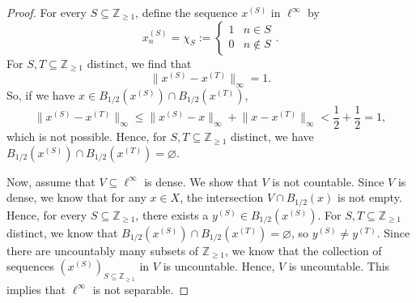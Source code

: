 \documentclass[a4paper, openany]{memoir}
\theoremstyle{definition}
\theoremstyle{plain}
\begin{document}
    \begin{proof}
        For every $S \subseteq \mathbb{Z}_{\geq 1}$, define the sequence $x^{(S)}$ in $\ell^\infty$ by
        \[x^{(S)}_n = \chi_S := \begin{cases}
            1 & n \in S \\
            0 & n \not\in S
        \end{cases}.\]
        For $S, T \subseteq \mathbb{Z}_{\geq 1}$ distinct, we find that
        \[\lVert x^{(S)} - x^{(T)} \rVert_\infty = 1.\]
        So, if we have $x \in B_{1/2}(x^{(S)}) \cap B_{1/2}(x^{(T)})$, 
        \[\lVert x^{(S)} - x^{(T)} \rVert_\infty \leq \lVert x^{(S)} - x \rVert_\infty + \lVert x - x^{(T)} \rVert_\infty < \frac{1}{2} + \frac{1}{2} = 1,\]
        which is not possible. Hence, for $S, T \subseteq \mathbb{Z}_{\geq 1}$ distinct, we have $B_{1/2}(x^{(S)}) \cap B_{1/2}(x^{(T)}) = \varnothing$.

        Now, assume that $V \subseteq \ell^\infty$ is dense. We show that $V$ is not countable. Since $V$ is dense, we know that for any $x \in X$, the intersection $V \cap B_{1/2}(x)$ is not empty. Hence, for every $S \subseteq \mathbb{Z}_{\geq 1}$, there exists a $y^{(S)} \in B_{1/2}(x^{(S)})$. For $S, T \subseteq \mathbb{Z}_{\geq 1}$ distinct, we know that $B_{1/2}(x^{(S)}) \cap B_{1/2}(x^{(T)}) = \varnothing$, so $y^{(S)} \neq y^{(T)}$. Since there are uncountably many subsets of $\mathbb{Z}_{\geq 1}$, we know that the collection of sequences $(x^{(S)})_{S \subseteq \mathbb{Z}_{\geq 1}}$ in $V$ is uncountable. Hence, $V$ is uncountable. This implies that $\ell^\infty$ is not separable.
    \end{proof}
    
\end{document}
